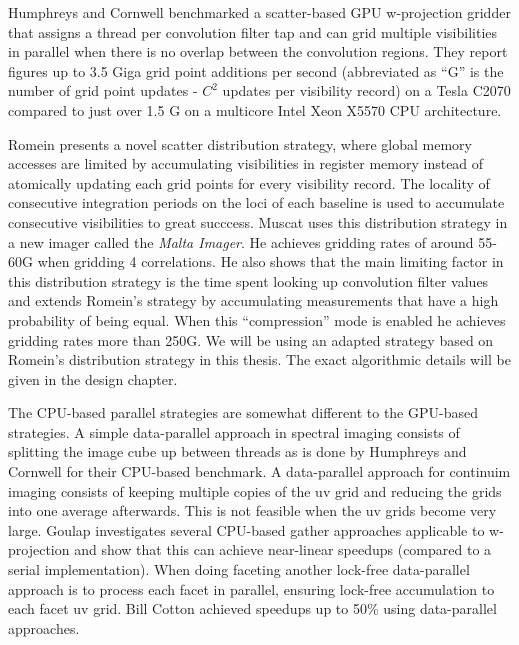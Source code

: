 Humphreys and Cornwell \cite{humphreys2011analysis} benchmarked a scatter-based GPU w-projection gridder that assigns a thread per convolution filter tap and can grid multiple visibilities in parallel when there is no overlap
between the convolution regions. They report figures up to 3.5 Giga grid point additions per second (abbreviated as ``G'' is the number of grid point updates - $C^2$ updates per visibility record) on a Tesla C2070 compared to 
just over 1.5 G on a multicore Intel Xeon X5570 CPU architecture. 

Romein \cite{romein2012efficient} presents a novel scatter distribution strategy, where global memory accesses are limited by accumulating visibilities in register memory instead of atomically updating
each grid points for every visibility record. The locality of consecutive integration periods on the loci of each baseline is used to accumulate consecutive visibilities to great succcess. 
Muscat \cite{muscat2014high} uses this distribution strategy in a new imager called the \textit{Malta Imager}. He achieves gridding rates of around 55-60G when gridding 4 correlations. He also
shows that the main limiting factor in this distribution strategy is the time spent looking up convolution filter values and extends Romein's strategy by accumulating measurements that have a high probability
of being equal. When this ``compression'' mode is enabled he achieves gridding rates more than 250G. We will be using an adapted strategy based on Romein's distribution strategy in this thesis. The exact algorithmic details will be given in the design chapter.

The CPU-based parallel strategies are somewhat different to the GPU-based strategies. A simple data-parallel approach in spectral imaging consists of splitting the image cube up between threads as is done by Humphreys and Cornwell \cite{humphreys2011analysis} for
their CPU-based benchmark. A data-parallel approach for continuim imaging consists of keeping multiple copies of the uv grid and reducing the grids into one average
afterwards. This is not feasible when the uv grids become very large. Goulap \cite{golap2015mutithreading} investigates several CPU-based gather approaches applicable to w-projection and show that
this can achieve near-linear speedups (compared to a serial implementation). When doing faceting another lock-free data-parallel approach is to process each facet in parallel, ensuring lock-free accumulation
to each facet uv grid. Bill Cotton \cite{obitfaceting} achieved speedups up to 50\% using data-parallel approaches.